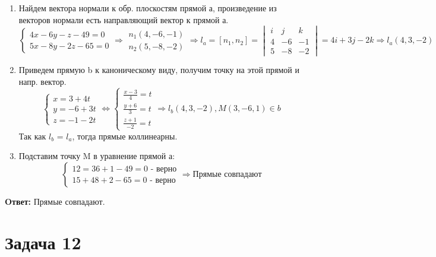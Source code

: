 \documentclass{article}
\begin{document}
\begin{enumerate}
  \item Найдем вектора нормали к обр. плоскостям прямой а,
    произведение из векторов нормали есть направляющий вектор
    к прямой а. 
    \[
      \begin{cases}
          4x - 6y - z - 49 = 0 \\ 
  5x - 8y -2z - 65 = 0

\end{cases} \Rightarrow 
\begin{aligned}
  n_1(4,-6,-1)\\ 
  n_2(5,-8,-2)
\end{aligned} \Rightarrow l_a = [n_1,n_2] = 
\begin{vmatrix}
  i &j &k\\ 
  4 &-6 &-1\\ 
  5 &-8 &-2 
\end{vmatrix} = 4i+3j-2k \Rightarrow l_a(4,3,-2)
    \]
  \item Приведем прямую b к каноническому виду, получим точку на этой прямой и напр. вектор. 
\[
   \begin{cases}
    x = 3 + 4t\\ 
    y = -6 + 3t\\ 
    z = -1 - 2t
  \end{cases}
\Leftrightarrow 
\begin{cases}
  \frac{x-3}{4} = t\\ 
  \frac{y+6}{3} = t\\ 
  \frac{z+1}{-2} = t 
\end{cases}
\Rightarrow l_b(4,3,-2), M(3,-6,1) \in b 
\]
Так как $l_b$ = $l_a$, тогда прямые коллинеарны. 
\item Подставим точку M в уравнение прямой а:
  \[
    \begin{cases}
      12= 36+1 - 49 = 0 \text{ - верно}\\
      15 + 48 + 2 - 65 = 0  \text{ - верно}
    \end{cases}
    \Rightarrow \text{Прямые совпадают}
  \]
  
\end{enumerate}

\textbf{Oтвет: }Прямые совпадают.

\section*{Задача 12}
\end{document}
